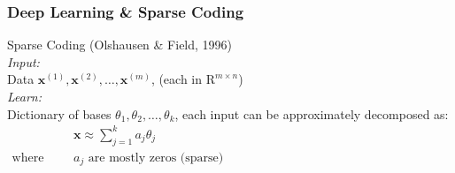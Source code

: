 \documentclass{beamer}              %
\begin{document}
\begin{frame}
	\frametitle{Deep Learning \& Sparse Coding}
	Sparse Coding (Olshausen \& Field, 1996) \\
	\textit{Input:} \\
	Data $\mathbf{x}^{(1)}, \mathbf{x}^{(2)}, \dots, \mathbf{x}^{(m)}$, (each in $\mathrm{R}^{m\times n}$) \\
	\vspace{0.2in}
	\textit{Learn:} \\
	Dictionary of bases $\theta_1,\theta_2,\dots,\theta_k$, each input can be approximately decomposed as: \\
	$\begin{matrix}
		\text{ } &&& \mathbf{x} \approx \sum_{j=1}^k a_j \theta_j \\
		\text{where} &&& a_j \text{ are mostly zeros (sparse)}
	\end{matrix}$
\end{frame}
\end{document}
